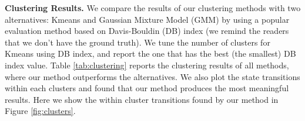 %
{\bf Clustering Results.} We compare the results of our clustering methods with two alternatives: Kmeans and Gaussian Mixture Model (GMM) by using a popular evaluation method based on Davis-Bouldin (DB) index \cite{dbindex} (we remind the readers that we don't have the ground truth). 
We tune the number of clusters for Kmeans using DB index, and report the one that has the best (the smallest) DB index value. 
Table \ref{tab:clustering} reports the clustering results of all methods, 
where our method outperforms the alternatives. We also plot the state transitions within each clusters  
and found that our method produces the most meaningful results. Here we show the within cluster transitions found by our
method in Figure \ref{fig:clusters}.  


